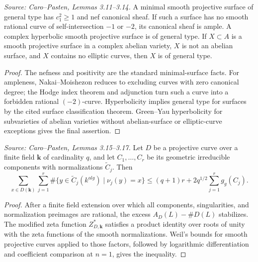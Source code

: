 \begin{lemma}
  \label{lem:cp_general_type_package}
  \textit{Source: Caro--Pasten, Lemmas 3.11--3.14.}
  A minimal smooth projective surface of general type has \(c_1^2\ge1\) and
  nef canonical sheaf.  If such a surface has no smooth rational curve of
  self-intersection \(-1\) or \(-2\), its canonical sheaf is ample.  A complex
  hyperbolic smooth projective surface is of general type.  If
  \(X\subset A\) is a smooth projective surface in a complex abelian variety,
  \(X\) is not an abelian surface, and \(X\) contains no elliptic curves, then
  \(X\) is of general type.
\end{lemma}
\begin{proof}
  The nefness and positivity are the standard minimal-surface facts.  For
  ampleness, Nakai--Moishezon reduces to excluding curves with zero
  canonical degree; the Hodge index theorem and adjunction turn such a curve
  into a forbidden rational \((-2)\)-curve.  Hyperbolicity implies general type
  for surfaces by the cited surface classification theorem.  Green--Yau
  hyperbolicity for subvarieties of abelian varieties without abelian-surface
  or elliptic-curve exceptions gives the final assertion.
\end{proof}

\begin{lemma}
  \label{lem:cp_weil_bound_singular_curve}
  \textit{Source: Caro--Pasten, Lemmas 3.15--3.17.}
  Let \(D\) be a projective curve over a finite field \(\mathbf k\) of
  cardinality \(q\), and let \(C_1,\ldots,C_r\) be its geometric irreducible
  components with normalizations \(\widetilde C_j\).  Then
  \[
    \sum_{x\in D(\mathbf k)}\sum_{j=1}^r
      \#\{y\in\widetilde C_j(k^{alg})\mid \nu_j(y)=x\}
    \le (q+1)r+2q^{1/2}\sum_{j=1}^r g_g(C_j).
  \]
\end{lemma}
\begin{proof}
  After a finite field extension over which all components, singularities, and
  normalization preimages are rational, the excess
  \(A_D(L)-\#D(L)\) stabilizes.  The modified zeta function
  \(Z^*_{D,\mathbf k}\) satisfies a product identity over roots of unity with
  the zeta functions of the smooth normalizations.  Weil's bounds for smooth
  projective curves applied to those factors, followed by logarithmic
  differentiation and coefficient comparison at \(n=1\), gives the inequality.
\end{proof}

